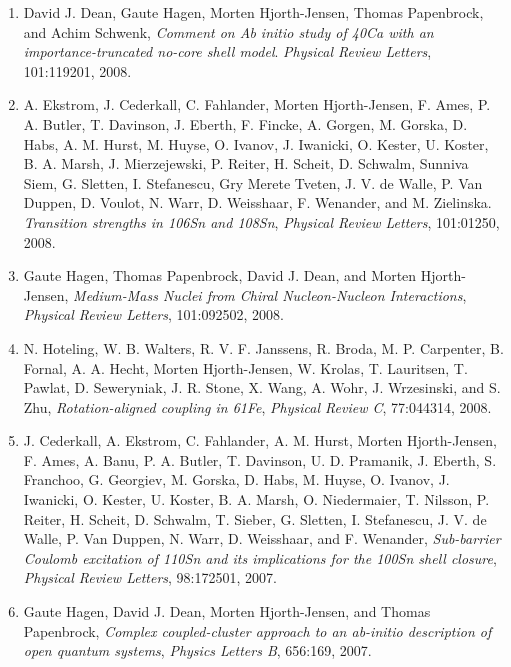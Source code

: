 \documentclass[%
oneside,                 %
final,                   %
10pt]{article}
\begin{document}
\begin{enumerate}
\item David J. Dean, Gaute Hagen, Morten Hjorth-Jensen, Thomas Papenbrock, and Achim Schwenk,  \emph{Comment on Ab initio study of 40Ca with an   importance-truncated no-core shell model}.  \emph{Physical Review Letters}, 101:119201, 2008. 

\item A. Ekstrom, J. Cederkall, C. Fahlander, Morten Hjorth-Jensen, F. Ames, P. A.   Butler, T. Davinson, J. Eberth, F. Fincke, A. Gorgen, M. Gorska, D. Habs,   A. M. Hurst, M. Huyse, O. Ivanov, J. Iwanicki, O. Kester, U. Koster, B. A.   Marsh, J. Mierzejewski, P. Reiter, H. Scheit, D. Schwalm, Sunniva Siem,   G. Sletten, I. Stefanescu, Gry Merete Tveten, J. V. de Walle, P. Van Duppen,   D. Voulot, N. Warr, D. Weisshaar, F. Wenander, and M. Zielinska.  \emph{Transition strengths in 106Sn and 108Sn},  \emph{Physical Review Letters}, 101:01250, 2008. 

\item Gaute Hagen, Thomas Papenbrock, David J. Dean, and Morten Hjorth-Jensen,  \emph{Medium-Mass Nuclei from Chiral Nucleon-Nucleon Interactions},  \emph{Physical Review Letters}, 101:092502, 2008. 

\item N. Hoteling, W. B. Walters, R. V. F. Janssens, R. Broda, M. P. Carpenter,   B. Fornal, A. A. Hecht, Morten Hjorth-Jensen, W. Krolas, T. Lauritsen,   T. Pawlat, D. Seweryniak, J. R. Stone, X. Wang, A. Wohr, J. Wrzesinski, and   S. Zhu,  \emph{Rotation-aligned coupling in 61Fe},  \emph{Physical Review C}, 77:044314, 2008. 

\item J. Cederkall, A. Ekstrom, C. Fahlander, A. M. Hurst, Morten Hjorth-Jensen,   F. Ames, A. Banu, P. A. Butler, T. Davinson, U. D. Pramanik, J. Eberth,   S. Franchoo, G. Georgiev, M. Gorska, D. Habs, M. Huyse, O. Ivanov,   J. Iwanicki, O. Kester, U. Koster, B. A. Marsh, O. Niedermaier, T. Nilsson,   P. Reiter, H. Scheit, D. Schwalm, T. Sieber, G. Sletten, I. Stefanescu, J. V.   de Walle, P. Van Duppen, N. Warr, D. Weisshaar, and F. Wenander, \emph{Sub-barrier Coulomb excitation of 110Sn and its   implications for the 100Sn shell closure},  \emph{Physical Review Letters}, 98:172501, 2007. 

\item Gaute Hagen, David J. Dean, Morten Hjorth-Jensen, and Thomas Papenbrock,  \emph{Complex coupled-cluster approach to an ab-initio description of   open quantum systems},  \emph{Physics Letters B}, 656:169, 2007. 


\end{enumerate}
\end{document}
